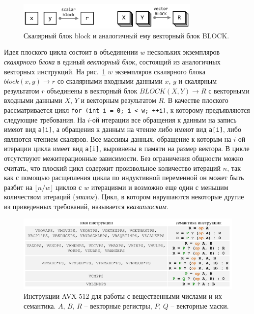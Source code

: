 \documentclass[a4paper,14pt]{extarticle}                     %
\theoremstyle{plain}                                         %
\begin{document}
\begin{figure}[ht]
\centering
\includegraphics[width=0.8\textwidth]{./fig/vec_block_BLOCK.pdf}
\singlespacing
\caption{Скалярный блок block и аналогичный ему векторный блок BLOCK.}
\label{fig:vec_block_BLOCK}
\end{figure}

Идея плоского цикла состоит в объединении $w$ нескольких экземпляров \textit{скалярного блока} в единый \textit{векторный блок}, состоящий из аналогичных векторных инструкций.
На рис.~\ref{fig:vec_block_BLOCK} $w$ экземпляров скалярного блока $block(x, y) \rightarrow r$ со скалярными входными данными $x$, $y$ и скалярным результатом $r$ объединены в векторный блок $BLOCK(X, Y) \rightarrow R$ с векторными входными данными $X$, $Y$ и векторным результатом $R$.
В качестве плоского рассматривается цикл \texttt{for (int i = 0; i < w; ++i)}, к которому предъявляются следующие требования.
На $i$-ой итерации все обращения к данным на запись имеют вид \texttt{a[i]}, а обращения к данным на чтение либо имеют вид \texttt{a[i]}, либо являются чтением скаляров.
Все массивы данных, обращение к которым на $i$-ой итерации цикла имеет вид \texttt{a[i]}, выровнены в памяти на размер вектора.
В цикле отсутствуют межитерационные зависимости.
Без ограничения общности можно считать, что плоский цикл содержит произвольное количество итераций $n$, так как с помощью расщепления цикла по индуктивной переменной он может быть разбит на $\lfloor n/w \rfloor$ циклов с $w$ итерациями и возможно еще один с меньшим количеством итераций (\textit{эпилог}).
Цикл, в котором нарушаются некоторые другие из приведенных требований, называется \textit{квазиплоским}.

\begin{figure}[!ht]
\centering
\includegraphics[width=1.0\textwidth]{./fig/vec_avx512_semantic_table.pdf}
\singlespacing
\caption{Инструкции AVX-512 для работы с вещественными числами и их семантика. $A$, $B$, $R$ -- векторные регистры, $P$, $Q$ -- векторные маски.}
\label{fig:vec_avx512_semantic_table}
\end{figure}
\end{document}
